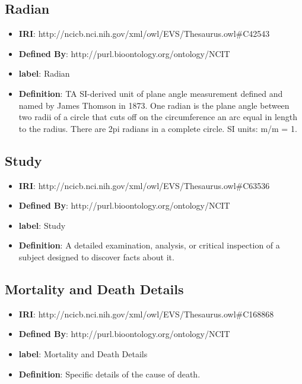 \documentclass[a4paper,12pt,oneside]{article}
\begin{document}
  \subsection{Radian}

\begin{itemize}
	\item \textbf{IRI}: http://ncicb.nci.nih.gov/xml/owl/EVS/Thesaurus.owl\#C42543
	\item \textbf{Defined By}: http://purl.bioontology.org/ontology/NCIT
	\item \textbf{label}: Radian
	\item \textbf{Definition}: TA SI-derived unit of plane angle measurement defined and named by James Thomson in 1873. One radian is the plane angle between two radii of a circle that cuts off on the circumference an arc equal in length to the radius. There are 2pi radians in a complete circle. SI units: m/m = 1.
\end{itemize}

  \subsection{Study}

\begin{itemize}
	\item \textbf{IRI}: http://ncicb.nci.nih.gov/xml/owl/EVS/Thesaurus.owl\#C63536
	\item \textbf{Defined By}: http://purl.bioontology.org/ontology/NCIT
	\item \textbf{label}: Study
	\item \textbf{Definition}: A detailed examination, analysis, or critical inspection of a subject designed to discover facts about it.
\end{itemize} 

  \subsection{Mortality and Death Details}

\begin{itemize}
	\item \textbf{IRI}: http://ncicb.nci.nih.gov/xml/owl/EVS/Thesaurus.owl\#C168868
	\item \textbf{Defined By}: http://purl.bioontology.org/ontology/NCIT
	\item \textbf{label}: Mortality and Death Details
	\item \textbf{Definition}: Specific details of the cause of death.
\end{itemize} 
\end{document}
